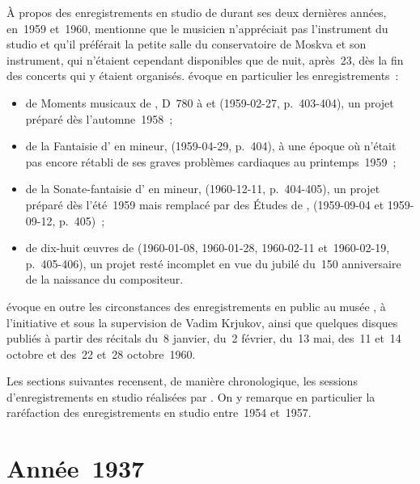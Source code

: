 À propos des enregistrements en studio de \VSofronitsky{} durant ses deux
dernières années, en~1959 et~1960, \citet[p.~403-408]{Shiryaeva} mentionne
que le musicien n'appréciait pas l'instrument du studio et qu'il préférait
la petite salle du conservatoire de Moskva et son instrument, qui n'étaient
cependant disponibles que de nuit, après~23, dès la fin des concerts
qui y étaient organisés.
\citeauthor{Shiryaeva} évoque en particulier les enregistrements~:
\begin{itemize}
 \item
 de Moments musicaux de \FSchubert{}, D~780  à  et
  (1959-02-27, p.~403-404), un projet préparé dès l'automne~1958~;
 \item
 de la Fantaisie d'\AScriabine{} en \kB mineur,  (1959-04-29,
 p.~404), à une époque où \VSofronitsky{} n'était pas encore rétabli de ses
 graves problèmes cardiaques au printemps~1959~;
 \item
 de la Sonate-fantaisie  d'\AScriabine{} en \kG \Sharp mineur,
  (1960-12-11, p.~404-405), un projet préparé dès l'été~1959 mais
 remplacé par des Études de \Scriabine{},   (1959-09-04 et 1959-09-12, p.~405)~;
 \item
 de dix-huit œuvres de \FChopin{} (1960-01-08, 1960-01-28, 1960-02-11
 et~1960-02-19, p.~405-406), un projet resté incomplet en vue du jubilé
 du~150\ieme{} anniversaire de la naissance du compositeur.
\end{itemize}

\citet[p.~407-408]{Shiryaeva} évoque en outre les circonstances des
enregistrements en public au musée \Scriabine{}, à l'initiative et sous la
supervision de Vadim Krjukov,
ainsi que quelques disques publiés à partir des récitals du~8 janvier, du~2
février, du~13 mai, des~11 et~14 octobre et des~22 et~28 octobre~1960.

Les sections suivantes recensent, de manière chronologique, les sessions
d'enregistrements en studio réalisées par \VSofronitsky{}.
On y remarque en particulier la raréfaction des enregistrements en studio
entre~1954 et~1957.

\section{Année~1937}

